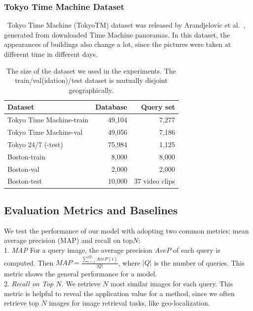 \subsubsection{Tokyo Time Machine Dataset} 
~Tokyo Time Machine (TokyoTM) dataset was released by Arandjelovic et al.~\cite{Arandjelovic16}, generated  from  downloaded  Time  Machine  panoramas. 
In this dataset, the appearances of buildings also change a lot, since the pictures were taken at different time in different days.

\begin{table}[htbp]
\begin{tabular}{l|rr}
Dataset & Database & Query set \\
\hline
\hline
Tokyo Time Machine-train & 49,104 & 7,277 \\
Tokyo Time Machine-val & 49,056 & 7,186 \\
Tokyo 24/7 (-test) & 75,984 & 1,125\\
\hline
Boston-train & 8,000 & 8,000 \\
Boston-val & 2,000 & 2,000 \\
Boston-test & 10,000 & 37 video clips
\end{tabular}
\caption{The size of the dataset we used in the experiments. The train/val(idation)/test dataset is mutually disjoint geographically.}
\label{table:dataset}
\end{table}

\subsection{Evaluation Metrics and Baselines}
We test the performance of our model with adopting two common metrics: mean average precision (MAP) and recall on top$N$:\\
1. \emph{MAP} For a query image, the average precision $AveP$ of each query is computed. Then $MAP=\frac{\sum_{i=1}^{|Q|}AveP(i)}{|Q|}$, where $|Q|$ is the number of queries. This metric shows the general performance for a model. \\
2. \emph{Recall on Top $N$.} We retrieve $N$ most similar images for each query. This metric is helpful to reveal the application value for a method, since we often retrieve top $N$ images for image retrieval tasks, like geo-localization.

